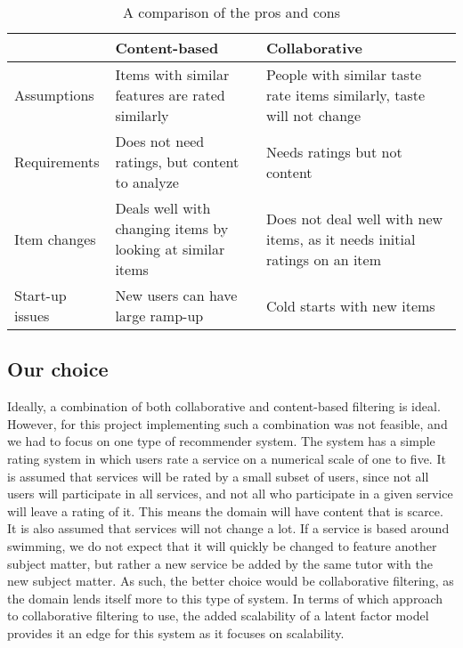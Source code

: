 \begin{table}[]
    \begin{tabular}{|p{}|p{}|p{}|}
    \hline
                    & Content-based                                              & Collaborative                                                             \\ \hline
    Assumptions     & Items with similar features are rated similarly            & People with similar taste rate items similarly, taste will not change     \\ \hline
    Requirements    & Does not need ratings, but content to analyze              & Needs ratings but not content                                             \\ \hline
    Item changes    & Deals well with changing items by looking at similar items & Does not deal well with new items, as it needs initial ratings on an item \\ \hline
    Start-up issues & New users can have large ramp-up                           & Cold starts with new items                                                \\ \hline
    \end{tabular}
    \caption{A comparison of the pros and cons}
    \label{tab:recprosandcons}
    \end{table}

\subsection{Our choice}
Ideally, a combination of both collaborative and content-based filtering is ideal.
However, for this project implementing such a combination was not feasible, and we had to focus on one type of recommender system.
The system has a simple rating system in which users rate a service on a numerical scale of one to five.
It is assumed that services will be rated by a small subset of users, since not all users will participate in all services, and not all who participate in a given service will leave a rating of it.
This means the domain will have content that is scarce.
It is also assumed that services will not change a lot.
If a service is based around swimming, we do not expect that it will quickly be changed to feature another subject matter, but rather a new service be added by the same tutor with the new subject matter.
As such, the better choice would be collaborative filtering, as the domain lends itself more to this type of system.
In terms of which approach to collaborative filtering to use, the added scalability of a latent factor model provides it an edge for this system as it focuses on scalability.

